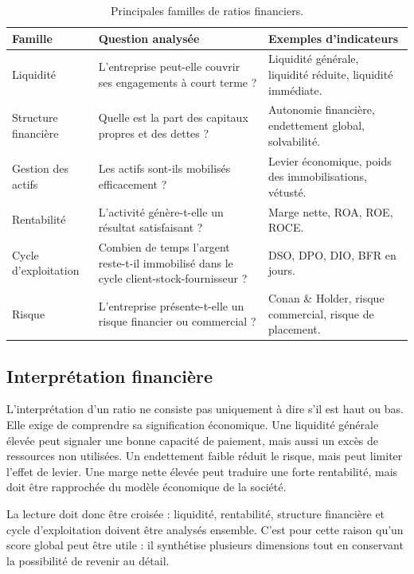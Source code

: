 \begin{table}[H]
\centering
\caption[Principales familles de ratios]{Principales familles de ratios financiers.}
\label{tab:famillesratios}
\begin{tabularx}{\linewidth}{|p{3.2cm}|X|X|}
\hline
\textbf{Famille} & \textbf{Question analysée} & \textbf{Exemples d'indicateurs} \\ \hline
Liquidité & L'entreprise peut-elle couvrir ses engagements à court terme ? & Liquidité générale, liquidité réduite, liquidité immédiate. \\ \hline
Structure financière & Quelle est la part des capitaux propres et des dettes ? & Autonomie financière, endettement global, solvabilité. \\ \hline
Gestion des actifs & Les actifs sont-ils mobilisés efficacement ? & Levier économique, poids des immobilisations, vétusté. \\ \hline
Rentabilité & L'activité génère-t-elle un résultat satisfaisant ? & Marge nette, ROA, ROE, ROCE. \\ \hline
Cycle d'exploitation & Combien de temps l'argent reste-t-il immobilisé dans le cycle client-stock-fournisseur ? & DSO, DPO, DIO, BFR en jours. \\ \hline
Risque & L'entreprise présente-t-elle un risque financier ou commercial ? & Conan \& Holder, risque commercial, risque de placement. \\ \hline
\end{tabularx}
\end{table}

\subsection{Interprétation financière}
\par L'interprétation d'un ratio ne consiste pas uniquement à dire s'il est
haut ou bas. Elle exige de comprendre sa signification économique. Une liquidité
générale élevée peut signaler une bonne capacité de paiement, mais aussi un
excès de ressources non utilisées. Un endettement faible réduit le risque, mais
peut limiter l'effet de levier. Une marge nette élevée peut traduire une forte
rentabilité, mais doit être rapprochée du modèle économique de la société.

\par La lecture doit donc être croisée : liquidité, rentabilité, structure
financière et cycle d'exploitation doivent être analysés ensemble. C'est pour
cette raison qu'un score global peut être utile : il synthétise plusieurs
dimensions tout en conservant la possibilité de revenir au détail.

